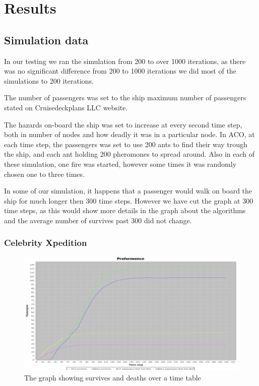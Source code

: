 \chapter{Results}
\label{ch:testing}

\section{Simulation data}
In our testing we ran the simulation from 200 to over 1000 iterations, as there was no significant difference from 200 to 1000 iterations we did most of the simulations to 200 iterations.

The number of passengers was set to the ship maximum number of passengers stated on Cruisedeckplans LLC\cite{cruseships} website.

The hazards on-board the ship was set to increase at every second time step, both in number of nodes and how deadly it was in a particular node. In ACO, at each time step, the passengers was set to use 200 ants to find their way trough the ship, and each ant holding 200 pheromones to spread around. Also in each of these simulation, one fire was started, however some times it was randomly chosen one to three times.

In some of our simulation, it happens that a passenger would walk on board the ship for much longer then 300 time steps. However we have cut the graph at 300 time steps, as this would show more details in the graph about the algorithms and the average number of survives past 300 did not change.


\subsection{Celebrity Xpedition}

\begin{figure} [h]
\centering
\hspace*{-5.5in}
\includegraphics[scale=0.35]{images/Graph using 200 rounds 140 passangers and shortest first one hazzard.png}
\caption{The graph showing survives and deaths over a time table}
\label{fig:celebShortest}
\end{figure}

